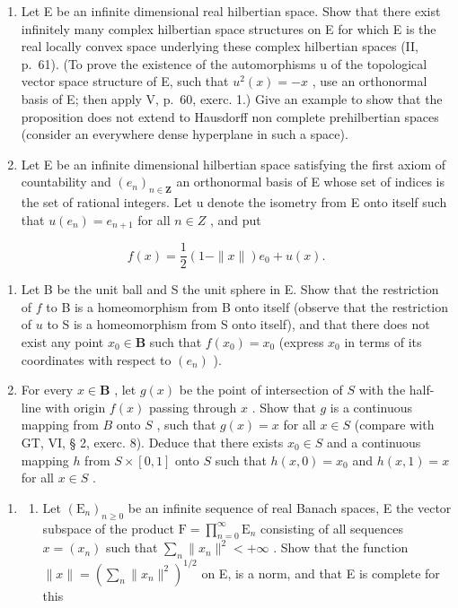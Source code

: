 \begin{enumerate}
\def\labelenumi{\arabic{enumi})}
\setcounter{enumi}{11}
\item
  Let E be an infinite dimensional real hilbertian space. Show that there exist infinitely many complex hilbertian space structures on E for which E is the real locally convex space underlying these complex hilbertian spaces (II, p.~61). (To prove the existence of the automorphisms u of the topological vector space structure of E, such that \(u^{2}(x) = -x\) , use an orthonormal basis of E; then apply V, p.~60, exerc. 1.) Give an example to show that the proposition does not extend to Hausdorff non complete prehilbertian spaces (consider an everywhere dense hyperplane in such a space).
\item
  Let E be an infinite dimensional hilbertian space satisfying the first axiom of countability and \((e_{n})_{n\in\mathbf{Z}}\) an orthonormal basis of E whose set of indices is the set of rational integers. Let u denote the isometry from E onto itself such that \(u(e_{n}) = e_{n+1}\) for all \(n \in Z\) , and put
\end{enumerate}

\[
f (x) = \frac {1}{2} (1 - \| x \|) e _ {0} + u (x).
\]

\begin{enumerate}
\def\labelenumi{\alph{enumi})}
\item
  Let B be the unit ball and S the unit sphere in E. Show that the restriction of \(f\) to B is a homeomorphism from B onto itself (observe that the restriction of \(u\) to S is a homeomorphism from S onto itself), and that there does not exist any point \(x_0 \in \mathbf{B}\) such that \(f(x_0) = x_0\) (express \(x_0\) in terms of its coordinates with respect to \((e_n)\) ).
\item
  For every \(x \in \mathbf{B}\) , let \(g(x)\) be the point of intersection of \(S\) with the half-line with origin \(f(x)\) passing through \(x\) . Show that \(g\) is a continuous mapping from \(B\) onto \(S\) , such that \(g(x) = x\) for all \(x \in S\) (compare with GT, VI, § 2, exerc. 8). Deduce that there exists \(x_0 \in S\) and a continuous mapping \(h\) from \(S \times [0,1]\) onto \(S\) such that \(h(x,0) = x_0\) and \(h(x,1) = x\) for all \(x \in S\) .
\end{enumerate}

\begin{enumerate}
\def\labelenumi{\arabic{enumi})}
\setcounter{enumi}{13}
\tightlist
\item
  \begin{enumerate}
  \def\labelenumii{\alph{enumii})}
  \tightlist
  \item
    Let \((\mathrm{E}_n)_{n\geqslant 0}\) be an infinite sequence of real Banach spaces, E the vector subspace of the product \(\mathrm{F} = \prod_{n = 0}^{\infty}\mathrm{E}_n\) consisting of all sequences \(x = (x_{n})\) such that \(\sum_{n}\| x_{n}\|^{2} < + \infty\) . Show that the function \(\| x\| = (\sum_{n}\| x_{n}\|^{2})^{1 / 2}\) on E, is a norm, and that E is complete for this
  \end{enumerate}
\end{enumerate}

